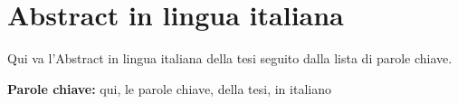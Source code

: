 \section*{Abstract in lingua italiana}
Qui va l'Abstract in lingua italiana della tesi seguito dalla lista di parole chiave.
\vspace{15pt}
\begin{tcolorbox}[arc=0pt, boxrule=0pt, colback=bluePoli!60, width=\textwidth, colupper=white]
    \textbf{Parole chiave:} qui, le parole chiave, della tesi, in italiano 
\end{tcolorbox}